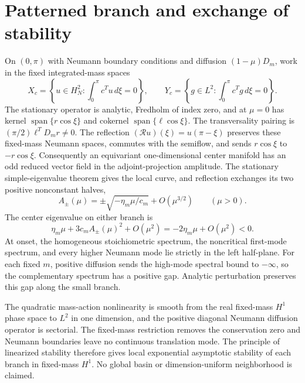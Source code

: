 \section*{Patterned branch and exchange of stability}
On $(0,\pi)$ with Neumann boundary conditions and diffusion
$(1-\mu)D_m$, work in the fixed integrated-mass spaces
\[
X_c=\left\{u\in H_N^2:\int_0^\pi c^Tu\,d\xi=0\right\},
\qquad
Y_c=\left\{g\in L^2:\int_0^\pi c^Tg\,d\xi=0\right\}.
\]
The stationary operator is analytic, Fredholm of index zero, and at
$\mu=0$ has kernel $\operatorname{span}\{r\cos\xi\}$ and cokernel
$\operatorname{span}\{\ell\cos\xi\}$.  The transversality pairing is
$(\pi/2)\ell^TD_mr\ne0$.  The reflection
$(\mathcal Ru)(\xi)=u(\pi-\xi)$ preserves these fixed-mass Neumann spaces,
commutes with the semiflow, and sends $r\cos\xi$ to $-r\cos\xi$.
Consequently an equivariant one-dimensional center manifold has an odd
reduced vector field in the adjoint-projection amplitude.  The stationary
simple-eigenvalue theorem gives the local curve, and reflection exchanges its
two positive nonconstant halves,
\[
A_\pm(\mu)=\pm\sqrt{-\eta_m\mu/c_m}+O(\mu^{3/2})
\qquad(\mu>0).
\]
The center eigenvalue on either branch is
\[
\eta_m\mu+3c_mA_\pm(\mu)^2+O(\mu^2)
=-2\eta_m\mu+O(\mu^2)<0.
\]
At onset, the homogeneous stoichiometric spectrum, the noncritical first-mode
spectrum, and every higher Neumann mode lie strictly in the left half-plane.
For each fixed $m$, positive diffusion sends the high-mode spectral bound to
$-\infty$, so the complementary spectrum has a positive gap.  Analytic
perturbation preserves this gap along the small branch.

The quadratic mass-action nonlinearity is smooth from the real fixed-mass
$H^1$ phase space to $L^2$ in one dimension, and the positive diagonal
Neumann diffusion operator is sectorial.  The fixed-mass restriction removes
the conservation zero and Neumann boundaries leave no continuous translation
mode.  The principle of linearized stability therefore gives local exponential
asymptotic stability of each branch in fixed-mass $H^1$.  No global basin or
dimension-uniform neighborhood is claimed.
